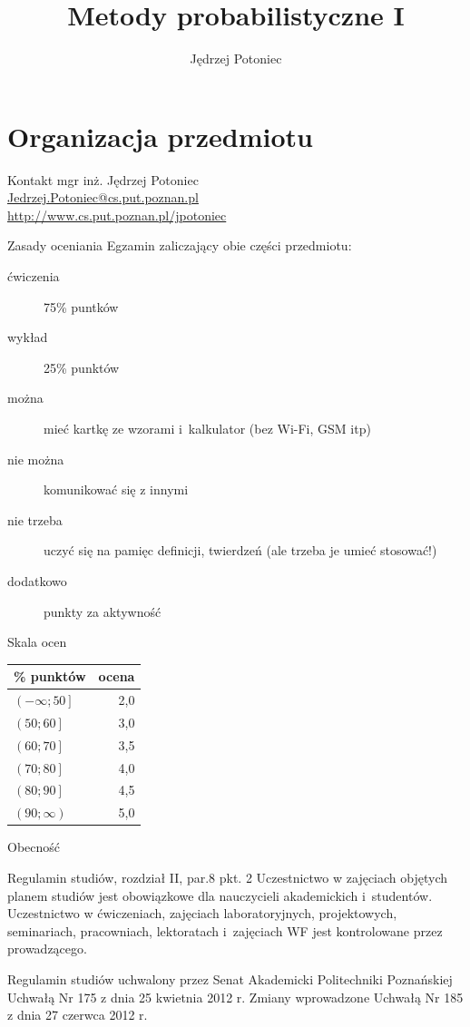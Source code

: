 \documentclass{beamer}
\title{Metody probabilistyczne I}
\author{Jędrzej Potoniec}
\date{}
\begin{document}
\begin{frame}
\titlepage
\end{frame}
\part{Organizacja przedmiotu}
\frame{\partpage}
\begin{frame}{Kontakt}
mgr inż. Jędrzej Potoniec \\
\url{Jedrzej.Potoniec@cs.put.poznan.pl}\\
\url{http://www.cs.put.poznan.pl/jpotoniec}
\end{frame}
\begin{frame}{Zasady oceniania}
Egzamin zaliczający obie części przedmiotu:
\begin{description}
\item[ćwiczenia] 75\% puntków
\item[wykład] 25\% punktów
\item[można] mieć kartkę ze wzorami i~kalkulator (bez Wi-Fi, GSM itp)
\item[nie można] komunikować się z innymi
\item[nie trzeba] uczyć się na pamięc definicji, twierdzeń (ale trzeba je umieć stosować!)
\item[dodatkowo] punkty za aktywność
\end{description}
\end{frame}
\begin{frame}{Skala ocen}
\begin{center}
\begin{tabular}{l|r}
\% punktów & ocena \\
\hline
$\left(-\infty; 50\right]$ & 2,0 \\
$\left(50; 60\right]$ & 3,0 \\
$\left(60; 70\right]$ & 3,5 \\
$\left(70; 80\right]$ & 4,0 \\
$\left(80; 90\right]$ & 4,5 \\
$\left(90; \infty\right)$ & 5,0 \\
\end{tabular}
\end{center}
\end{frame}
\begin{frame}{Obecność}
\begin{block}{Regulamin studiów, rozdział II, par.8 pkt. 2}
Uczestnictwo w zajęciach objętych planem studiów jest obowiązkowe dla nauczycieli akademickich i~studentów.
Uczestnictwo w ćwiczeniach, zajęciach laboratoryjnych, projektowych, seminariach, pracowniach, lektoratach i~zajęciach WF jest kontrolowane przez prowadzącego.
\end{block}
{\tiny Regulamin studiów uchwalony przez Senat Akademicki Politechniki Poznańskiej Uchwałą Nr 175 z dnia 25 kwietnia 2012 r. Zmiany wprowadzone Uchwałą Nr 185 z dnia 27 czerwca 2012 r.}
\end{frame}
\end{document}
